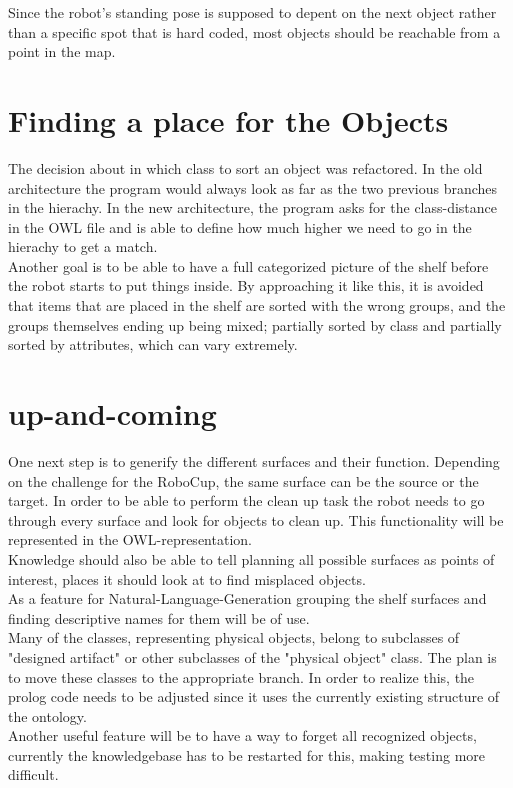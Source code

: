 \documentclass[main.tex]{subfiles}
\begin{document}
Since the robot's standing pose is supposed to depent on the next object rather than a specific spot that is hard coded, most objects should be reachable from a point in the map. 

		\section{Finding a place for the Objects}
		The decision about in which class to sort an object was refactored. In the old architecture the program would always look as far as the two previous branches in the hierachy. In the new architecture, the program asks for the class-distance in the OWL file and is able to define how much higher we need to go in the hierachy to get a match.\\
Another goal is to be able to have a full categorized picture of the shelf before the robot starts to put things inside. By approaching it like this, it is avoided that items that are placed in the shelf are sorted with the wrong groups, and the groups themselves ending up being mixed; partially sorted by class and partially sorted by attributes, which can vary extremely.
 

		\section{up-and-coming}
		One next step is to generify the different surfaces and their function. Depending on the challenge for the RoboCup, the same surface can be the source or the target. In order to be able to perform the clean up task the robot needs to go through every surface and look for objects to clean up. This functionality will be represented in the OWL-representation.\\
		Knowledge should also be able to tell planning all possible surfaces as points of interest, places it should look at to find misplaced objects.\\
		As a feature for Natural-Language-Generation grouping the shelf surfaces and finding descriptive names for them will be of use.\\
		Many of the classes, representing physical objects, belong to subclasses of "designed artifact" or other subclasses of the "physical object" class. The plan is to move these classes to the appropriate branch. In order to realize this, the prolog code needs to be adjusted since it uses the currently existing structure of the ontology.\\
		Another useful feature will be to have a way to forget all recognized objects, currently the knowledgebase has to be restarted for this, making testing more difficult. 
\end{document}
